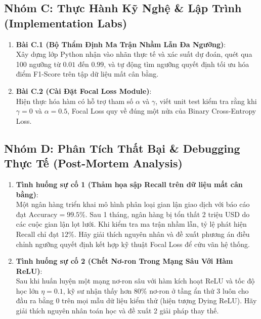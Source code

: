 \subsection{Nhóm C: Thực Hành Kỹ Nghệ \& Lập Trình (Implementation Labs)}
\begin{enumerate}
  \item \textbf{Bài C.1 (Bộ Thẩm Định Ma Trận Nhầm Lẫn Đa Ngưỡng)}: \\
  Xây dựng lớp Python  nhận vào nhãn thực tế và xác suất dự đoán, quét qua 100 ngưỡng từ $0.01$ đến $0.99$, và tự động tìm ngưỡng quyết định tối ưu hóa điểm F1-Score trên tập dữ liệu mất cân bằng.

  \item \textbf{Bài C.2 (Cài Đặt Focal Loss Module)}: \\
  Hiện thực hóa hàm  có hỗ trợ tham số $\alpha$ và $\gamma$, viết unit test kiểm tra rằng khi $\gamma=0$ và $\alpha=0.5$, Focal Loss quy về đúng một nửa của Binary Cross-Entropy Loss.
\end{enumerate}

\subsection{Nhóm D: Phân Tích Thất Bại \& Debugging Thực Tế (Post-Mortem Analysis)}
\begin{enumerate}
  \item \textbf{Tình huống sự cố 1 (Thảm họa sập Recall trên dữ liệu mất cân bằng)}: \\
  Một ngân hàng triển khai mô hình phân loại gian lận giao dịch với báo cáo đạt $\text{Accuracy} = 99.5\%$. Sau 1 tháng, ngân hàng bị tổn thất 2 triệu USD do các cuộc gian lận lọt lưới. Khi kiểm tra ma trận nhầm lẫn, tỷ lệ phát hiện $\text{Recall}$ chỉ đạt $12\%$. Hãy giải thích nguyên nhân và đề xuất phương án điều chỉnh ngưỡng quyết định kết hợp kỹ thuật Focal Loss để cứu vãn hệ thống.

  \item \textbf{Tình huống sự cố 2 (Chết Nơ-ron Trong Mạng Sâu Với Hàm ReLU)}: \\
  Sau khi huấn luyện một mạng nơ-ron sâu với hàm kích hoạt ReLU và tốc độ học lớn $\eta = 0.1$, kỹ sư nhận thấy hơn $80\%$ nơ-ron ở tầng ẩn thứ 3 luôn cho đầu ra bằng $0$ trên mọi mẫu dữ liệu kiểm thử (hiện tượng Dying ReLU). Hãy giải thích nguyên nhân toán học và đề xuất 2 giải pháp thay thế.
\end{enumerate}

